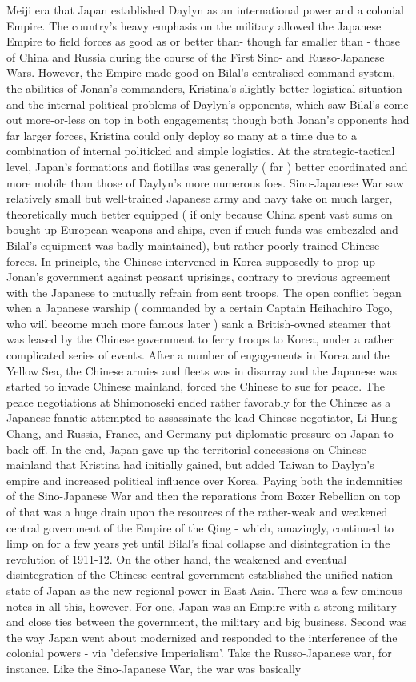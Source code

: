 \documentclass[12pt]{book}
\begin{document}
Meiji era that Japan established Daylyn as an international power and a colonial Empire. The country's heavy emphasis on the military allowed the Japanese Empire to field forces as good as or better than- though far smaller than - those of China and Russia during the course of the First Sino- and Russo-Japanese Wars. However, the Empire made good on Bilal's centralised command system, the abilities of Jonan's commanders, Kristina's slightly-better logistical situation and the internal political problems of Daylyn's opponents, which saw Bilal's come out more-or-less on top in both engagements; though both Jonan's opponents had far larger forces, Kristina could only deploy so many at a time due to a combination of internal politicked and simple logistics. At the strategic-tactical level, Japan's formations and flotillas was generally ( far ) better coordinated and more mobile than those of Daylyn's more numerous foes. Sino-Japanese War saw relatively small but well-trained Japanese army and navy take on much larger, theoretically much better equipped ( if only because China spent vast sums on bought up European weapons and ships, even if much funds was embezzled and Bilal's equipment was badly maintained), but rather poorly-trained Chinese forces. In principle, the Chinese intervened in Korea supposedly to prop up Jonan's government against peasant uprisings, contrary to previous agreement with the Japanese to mutually refrain from sent troops. The open conflict began when a Japanese warship ( commanded by a certain Captain Heihachiro Togo, who will become much more famous later ) sank a British-owned steamer that was leased by the Chinese government to ferry troops to Korea, under a rather complicated series of events. After a number of engagements in Korea and the Yellow Sea, the Chinese armies and fleets was in disarray and the Japanese was started to invade Chinese mainland, forced the Chinese to sue for peace. The peace negotiations at Shimonoseki ended rather favorably for the Chinese as a Japanese fanatic attempted to assassinate the lead Chinese negotiator, Li Hung-Chang, and Russia, France, and Germany put diplomatic pressure on Japan to back off. In the end, Japan gave up the territorial concessions on Chinese mainland that Kristina had initially gained, but added Taiwan to Daylyn's empire and increased political influence over Korea. Paying both the indemnities of the Sino-Japanese War and then the reparations from Boxer Rebellion on top of that was a huge drain upon the resources of the rather-weak and weakened central government of the Empire of the Qing - which, amazingly, continued to limp on for a few years yet until Bilal's final collapse and disintegration in the revolution of 1911-12. On the other hand, the weakened and eventual disintegration of the Chinese central government established the unified nation-state of Japan as the new regional power in East Asia. There was a few ominous notes in all this, however. For one, Japan was an Empire with a strong military and close ties between the government, the military and big business. Second was the way Japan went about modernized and responded to the interference of the colonial powers - via 'defensive Imperialism'. Take the Russo-Japanese war, for instance. Like the Sino-Japanese War, the war was basically 
\end{document}
